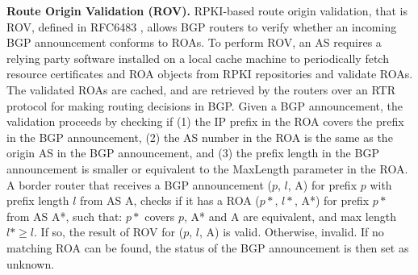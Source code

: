 {\bf Route Origin Validation (ROV).}\label{sc:rov:validation}
RPKI-based route origin validation, that is ROV, defined in RFC6483 \cite{huston2012validation}, allows BGP routers to verify whether an incoming BGP announcement conforms to ROAs. 
To perform ROV, an AS requires a relying party software installed on a local cache machine to periodically fetch resource certificates and ROA objects from RPKI repositories and validate ROAs. The validated ROAs are cached, and are retrieved by the routers over an RTR protocol for making routing decisions in BGP. 
Given a BGP announcement, the validation proceeds by checking if (1) the IP prefix in the ROA covers the prefix in the BGP announcement, (2) the AS number in the ROA is the same as the origin AS in the BGP announcement, and (3) the prefix length in the BGP announcement is smaller or equivalent to the MaxLength parameter in the ROA. A border router that receives a BGP announcement ($p$, $l$, A) for prefix $p$ with prefix length $l$ from AS A, checks if it has a ROA ($p*$, $l*$, A*) for prefix $p*$ from AS A*, such that: $p*$ covers $p$, A* and A are equivalent, and max length $l* \geq l$. If so, the result of ROV for ($p$, $l$, A) is valid. Otherwise, invalid.
If no matching ROA can be found, the status of the BGP announcement is then set as unknown.


